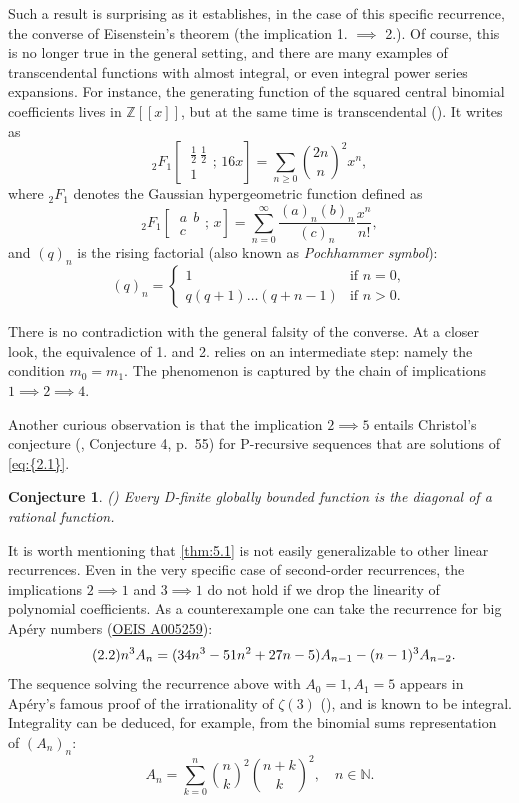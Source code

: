 \documentclass[11pt]{article}
\theoremstyle{definition}
\theoremstyle{plain}
\newtheorem{conj}[defi]{Conjecture}
\theoremstyle{remark}
\begin{document}
Such a result is surprising as it establishes, in the case of this specific recurrence, the converse of Eisenstein's theorem (the implication 1. $\implies$ 2.). Of course, this is no longer true in the general setting, and there are many examples of transcendental functions with almost integral, or even integral power series expansions. For instance, the generating function of the squared central binomial coefficients lives in $\mathbb{Z}[[x]]$, but at the same time is transcendental (\cite[p.~271--272]{Fur67}). It writes as
\[_{2}F_{1}\!\left[\!\begin{array}{c}\ \frac{1}{2} \ \frac{1}{2}\\ \ 1
\end{array}
; \, 16x
\right] = \sum\limits_{n\geq0} \binom{2n}{n}^2x^n,\]
where ${}_2F_1$ denotes the Gaussian hypergeometric function defined as 
\[_{2}F_{1}\!\left[\!\begin{array}{c}\ a \ \ b\\ \ c
\end{array}
; \, x
\right] = \sum\limits_{n=0}^{\infty} \frac{(a)_n(b)_n}{(c)_n} \frac{x^n}{n!},\]
and $(q)_n$ is the rising factorial (also known as \emph{Pochhammer symbol}):
\[
(q)_n = 
\begin{cases}
1 & \text{if } n = 0, \\
q(q+1)\ldots(q+n-1) & \text{if } n > 0.
\end{cases}
\]

There is no contradiction with the general falsity of the converse. At a closer look, the equivalence of 1. and 2. relies on an intermediate step: namely the condition $m_0=m_1$. The phenomenon is captured by the chain of implications $1 \implies 2 \implies 4$. 

Another curious observation is that the implication $2 \implies 5$ entails Christol's conjecture (\cite{Chr90}, Conjecture 4, p.~55) for P-recursive sequences that are solutions of \eqref{eq:{2.1}}.

\begin{conj}(\cite{Chr90}) Every D-finite globally bounded function is the diagonal of a rational function.
\end{conj}
It is worth mentioning that \cref{thm:5.1} is not easily generalizable to other linear recurrences.
Even in the very specific case of second-order recurrences, the implications $2 \implies 1$ and $3 \implies 1$ do not hold if we drop the linearity of polynomial coefficients. As a counterexample one can take the recurrence for big Apéry numbers (\href{https://oeis.org/A005259}{OEIS A005259}):
\begin{equation}\label{eq:{2.2}}\tag{2.2}
n^3 A_n = (34n^3-51n^2+27n-5)A_{n-1} - (n-1)^3A_{n-2}.
\end{equation}
The sequence solving the recurrence above with $A_0=1, A_1=5$ appears in Apéry's famous proof of the irrationality of $\zeta(3)$ (\cite{Ap79}), and is known to be integral. Integrality can be deduced, for example, from the binomial sums representation of $(A_n)_n$:
\[A_n = \sum\limits_{k=0}^{n} \binom{n}{k}^2 \binom{n+k}{k}^2, \quad  n \in \mathbb{N}.\]
\end{document}
